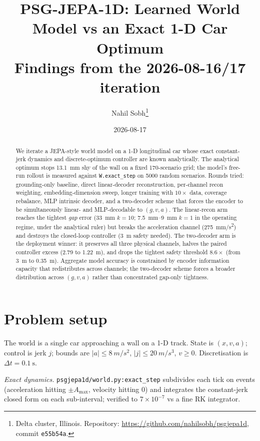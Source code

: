\documentclass[11pt,a4paper]{article}
\title{PSG-JEPA-1D: Learned World Model vs an Exact 1-D Car Optimum \\
  \large Findings from the 2026-08-16/17 iteration}
\author{Nahil Sobh\thanks{Delta cluster, Illinois. Repository:
  \url{https://github.com/nahilsobh/psgjepa1d}, commit \texttt{e55b54a}.}}
\date{2026-08-17}
\begin{document}
\maketitle

\begin{abstract}
We iterate a JEPA-style world model on a 1-D longitudinal car whose exact
constant-jerk dynamics and discrete-optimum controller are known analytically.
The analytical optimum stops \SI{13.1}{\mm} shy of the wall on a fixed
170-scenario grid; the model's free-run rollout is measured against
\texttt{W.exact\_step} on 5000 random scenarios. Rounds tried:
grounding-only baseline, direct linear-decoder reconstruction, per-channel
recon weighting, embedding-dimension sweep, longer training with $10\times$
data, coverage rebalance, MLP intrinsic decoder, and a two-decoder scheme
that forces the encoder to be simultaneously linear- and MLP-decodable to
$(g, v, a)$. The linear-recon arm reaches the tightest \emph{gap} error
(\SI{33}{\mm} $k{=}10$; \SIrange{7.5}{9}{\mm} $k{=}1$ in the operating
regime, under the analytical ruler) but breaks the acceleration channel
(\SI{275}{\mm/\s^2}) and destroys the closed-loop controller (\SI{3}{\m}
safety needed). The two-decoder arm is the deployment winner: it preserves
all three physical channels, halves the paired controller excess
(\SI{2.79}{} to \SI{1.22}{\m}), and drops the tightest safety threshold
$8.6\times$ (from \SI{3}{\m} to \SI{0.35}{\m}). Aggregate model accuracy
is constrained by encoder information capacity that redistributes across
channels; the two-decoder scheme forces a broader distribution across
$(g, v, a)$ rather than concentrated gap-only tightness.
\end{abstract}

\section{Problem setup}
\label{sec:setup}

The world is a single car approaching a wall on a 1-D track. State is
$(x, v, a)$; control is jerk $j$; bounds are $|a| \le \SI{8}{m/s^2}$,
$|j| \le \SI{20}{m/s^3}$, $v \ge 0$. Discretisation is $\Delta t = \SI{0.1}{\s}$.

\emph{Exact dynamics.} \texttt{psgjepa1d/world.py:exact\_step} subdivides each
tick on events (acceleration hitting $\pm A_{\max}$, velocity hitting 0) and
integrates the constant-jerk closed form on each sub-interval; verified to
$7 \times 10^{-7}$ vs a fine RK integrator.
\end{document}
